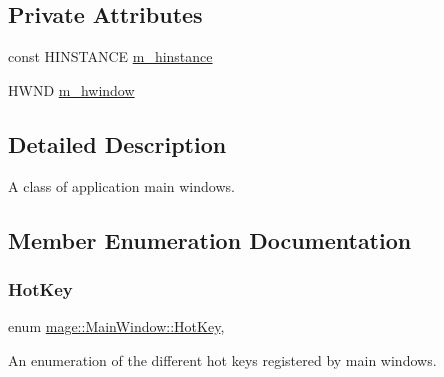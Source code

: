 \subsection*{Private Attributes}
\begin{DoxyCompactItemize}
\item 
const H\+I\+N\+S\+T\+A\+N\+CE \hyperlink{classmage_1_1_main_window_a314759bf324579b568528bbf99bc5c7f}{m\+\_\+hinstance}
\item 
H\+W\+ND \hyperlink{classmage_1_1_main_window_afc9afabcf8a52d79f02c8352451863cc}{m\+\_\+hwindow}
\end{DoxyCompactItemize}


\subsection{Detailed Description}
A class of application main windows. 

\subsection{Member Enumeration Documentation}
\hypertarget{classmage_1_1_main_window_a313cce567381c233d893d982e2e0fd74}{}\label{classmage_1_1_main_window_a313cce567381c233d893d982e2e0fd74} 
\subsubsection{\texorpdfstring{Hot\+Key}{HotKey}}
{\footnotesize\ttfamily enum \hyperlink{classmage_1_1_main_window_a313cce567381c233d893d982e2e0fd74}{mage\+::\+Main\+Window\+::\+Hot\+Key}\hspace{0.3cm}{\ttfamily [strong]}, {\ttfamily [private]}}

An enumeration of the different hot keys registered by main windows.


